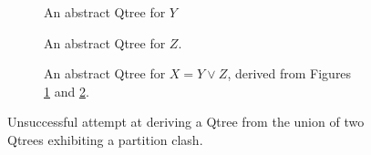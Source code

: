 \begin{figure}[H]
	\centering
	\begin{subfigure}[t]{.3\linewidth}
		\centering
		\caption{An abstract Qtree for $Y$}\label{fig2:qtree-y'}
	\end{subfigure}
	\hfill
	\begin{subfigure}[t]{.3\linewidth}
		\centering{}
		\caption{An abstract Qtree for $Z$.}\label{fig2:qtree-z'}
	\end{subfigure}
	\hfill
	\begin{subfigure}[t]{.3\linewidth}
		\centering{}
		\caption{An abstract Qtree for $X = Y \vee Z$, derived from Figures \ref{fig2:qtree-y'} and \ref{fig2:qtree-z'}.}\label{fig2:qtree-xy-disj-degenerate}
	\end{subfigure}
	\caption{Unsuccessful attempt at deriving a Qtree from the union of two Qtrees exhibiting a partition clash.}\label{fig2:qtree-x-y-z-disj-degenerate}
\end{figure}

